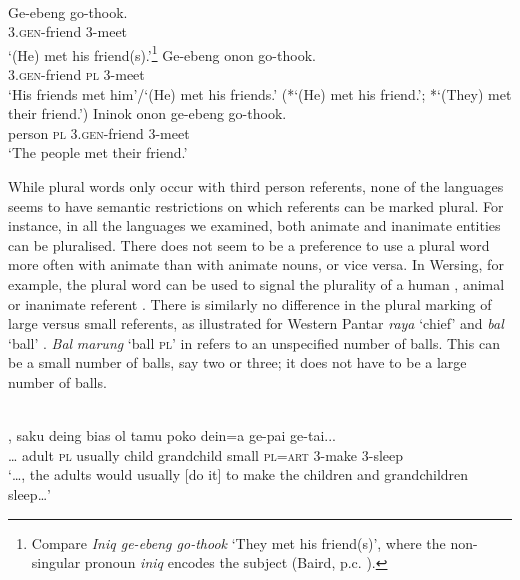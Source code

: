 \ea\label{bkm:Ref354060976}
 \\
  \ea
  \gll Ge-ebeng go-thook. \\
  3.\textsc{gen}-friend 3-meet \\
\glt `(He) met his friend(s).'\footnote{  Compare \textit{Iniq ge-ebeng go-thook} `They met his friend(s)', where the non-singular pronoun \textit{iniq} encodes the subject (Baird, p.c. ).}
  \ex
  \gll Ge-ebeng onon go-thook. \\
  3.\textsc{gen}-friend \textsc{pl} 3-meet \\
\glt `His friends met him'/`(He) met his friends.'
  (*`(He) met his friend.'; *`(They) met their friend.')
  \ex
  \gll Ininok onon ge-ebeng go-thook. \\
  person  \textsc{pl} 3.\textsc{gen}-friend 3-meet \\
\glt `The people met their friend.'
  \z
\z

While plural words only occur with third person referents, none of the languages seems to have semantic restrictions on which referents can be marked plural. For instance, in all the languages we examined, both animate and inanimate entities can be pluralised. There does not seem to be a preference to use a plural word more often with animate than with animate nouns, or vice versa. In Wersing, for example, the plural word can be used to signal the plurality of a human , animal  or inanimate referent . There is similarly no difference in the plural marking of large versus small referents, as illustrated for Western Pantar \textit{raya} `chief'  and \textit{bal} `ball' . \textit{Bal} \textit{marung} `ball \textsc{pl'} in  refers to an unspecified number of balls. This can be a small number of balls, say two or three; it does not have to be a large number of balls.




\ea%
\label{ex:9:3}
 \\
\gll  {\dots}, saku deing bias ol tamu poko dein=a ge-pai ge-tai...\\
  {\dots} adult \textsc{pl} usually child grandchild small \textsc{pl=art} \textsc{3-}make 3-sleep\\
\glt `{\dots}, the adults would usually [do it] to make the children and grandchildren sleep{\dots}'
\z








